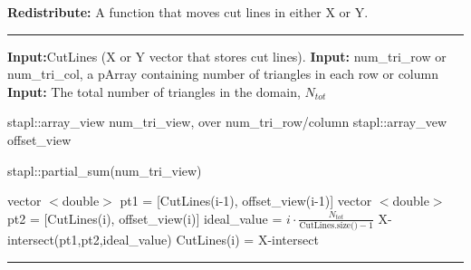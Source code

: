 \documentclass[11pt, letterpaper,titlepage,oneside]{article}
\begin{document}
\noindent\begin{minipage}{\textwidth}
\textbf{Redistribute:} A function that moves cut lines in either X or Y. \\
\rule{\textwidth}{0.4pt}
\begin{algorithmic}
\STATE \textbf{Input:}CutLines (X or Y vector that stores cut lines). 
\STATE \textbf{Input:} num\_tri\_row or num\_tri\_col, a pArray containing number of triangles in each row or column 
\STATE \textbf{Input:} The total number of triangles in the domain, $N_{tot}$

\STATE stapl::array\_view num\_tri\_view, over num\_tri\_row/column
\STATE stapl::array\_vew offset\_view

\STATE stapl::partial\_sum(num\_tri\_view) 



	\STATE vector $<$double$>$ pt1 = [CutLines(i-1), offset\_view(i-1)]
	\STATE vector $<$double$>$ pt2 = [CutLines(i), offset\_view(i)]
	\STATE ideal\_value = $i\cdot \frac{N_{tot}}{\text{CutLines.size()}-1}$
	\STATE X-intersect(pt1,pt2,ideal\_value) 
	\STATE CutLines(i) = X-intersect
\ENDFOR
\end{algorithmic}
\rule{\textwidth}{0.4pt}
\end{minipage}




\end{document}
